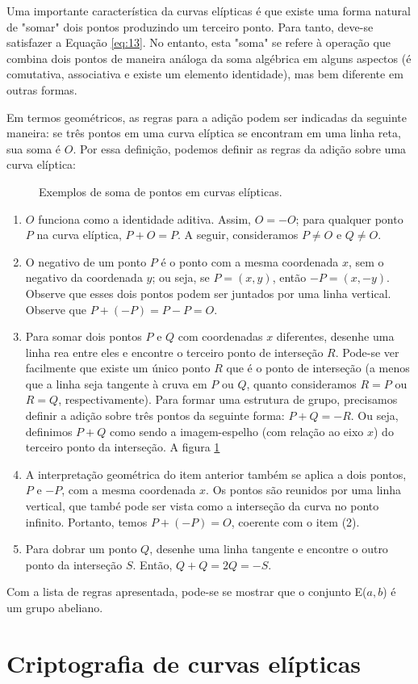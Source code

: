 Uma importante característica da curvas elípticas é que existe uma forma natural de "somar" dois pontos produzindo um terceiro ponto. Para tanto, deve-se satisfazer a Equação \ref{eq:13}. No entanto, esta "soma" se refere à operação que combina dois pontos de maneira análoga da soma algébrica em alguns aspectos (é comutativa, associativa e existe um elemento identidade), mas bem diferente em outras formas.

Em termos geométricos, as regras para a adição podem ser indicadas da seguinte maneira: se três pontos em uma curva elíptica se encontram em uma linha reta, sua soma é $O$. Por essa definição, podemos definir as regras da adição sobre uma curva elíptica:

\begin{figure}[h!]
\begin{center}
\end{center}
\caption{Exemplos de soma de pontos em curvas elípticas.}
\label{fig:pontos}
\end{figure}

\begin{enumerate}
	\item $O$ funciona como a identidade aditiva. Assim, $O = -O$; para qualquer ponto $P$ na curva elíptica, $P + O = P$. A seguir, consideramos $P \neq O$ e $Q \neq O$.
	\item O negativo de um ponto \(P\) é o ponto com a mesma coordenada \(x\), sem o negativo da coordenada \(y\); ou seja, se $P=(x,y)$, então $-P=(x,-y)$. Observe que esses dois pontos podem ser juntados por uma linha vertical. Observe que $P+(-P)=P-P=O$.
	\item Para somar dois pontos \(P\) e \(Q\) com coordenadas \(x\) diferentes, desenhe uma linha rea entre eles e encontre o terceiro ponto de interseção \(R\). Pode-se ver facilmente que existe um único ponto \(R\) que é o ponto de interseção (a menos que a linha seja tangente à cruva em \(P\) ou \(Q\), quanto consideramos $R=P$ ou $R=Q$, respectivamente). Para formar uma estrutura de grupo, precisamos definir a adição sobre três pontos da seguinte forma: $P+Q=-R$. Ou seja, definimos $P+Q$ como sendo a imagem-espelho (com relação ao eixo \(x\)) do terceiro ponto da interseção. A figura \ref{fig:pontos}
	\item A interpretação geométrica do item anterior também se aplica a dois pontos, \(P\) e \(-P\), com a mesma coordenada \(x\). Os pontos são reunidos por uma linha vertical, que també pode ser vista como a interseção da curva no ponto infinito. Portanto, temos $P+(-P)=O$, coerente com o item (2).
	\item Para dobrar um ponto \(Q\), desenhe uma linha tangente e encontre o outro ponto da interseção \(S\). Então, $Q+Q=2Q=-S$.
\end{enumerate}

Com a lista de regras apresentada, pode-se se mostrar que o conjunto E(\(a, b\)) é um grupo abeliano. \cite{Stallings:2011}

%
%
\section{Criptografia de curvas elípticas}
